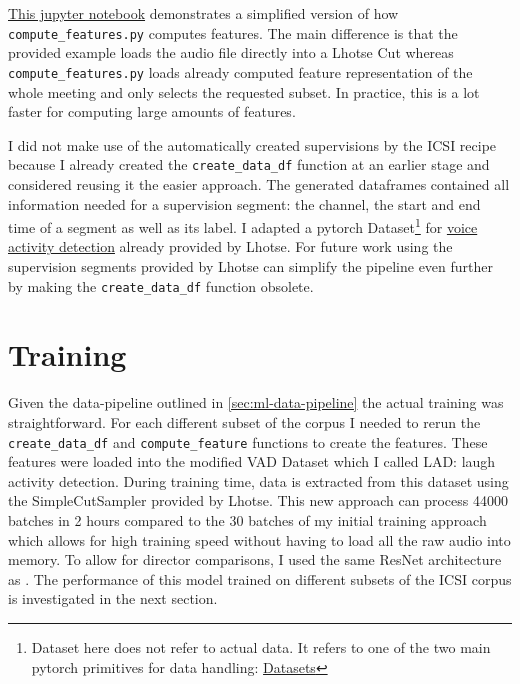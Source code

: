 \documentclass[bsc,frontabs,parskip,deptreport]{infthesis}
\begin{document}
\href{https://github.com/LasseWolter/laughter-detection-icsi/blob/main/Demo.ipynb}{This jupyter notebook} demonstrates a simplified version of how \verb|compute_features.py| computes features. 
The main difference is that the provided example loads the audio file directly into a Lhotse Cut whereas \verb|compute_features.py| loads already computed feature representation of the whole meeting and only selects the requested subset. In practice, this is a lot faster for computing large amounts of features.

I did not make use of the automatically created supervisions by the ICSI recipe because I already created the \verb|create_data_df| function at an earlier stage and considered reusing it the easier approach.
The generated dataframes contained all information needed for a supervision segment: the channel, the start and end time of a segment as well as its label. 
I adapted a pytorch Dataset\footnote{Dataset here does not refer to actual data. It refers to one of the two main pytorch primitives for data handling: \href{https://pytorch.org/tutorials/beginner/basics/data_tutorial.html}{Datasets}} for \href{https://lhotse.readthedocs.io/en/latest/datasets.html#lhotse.dataset.vad.VadDataset}{voice activity detection} already provided by Lhotse.
For future work using the supervision segments provided by Lhotse can simplify the pipeline even further by making the \verb|create_data_df| function obsolete. 

\section{Training}
Given the data-pipeline outlined in \autoref{sec:ml-data-pipeline} the actual training was straightforward. For each different subset of the corpus I needed to rerun the \verb|create_data_df| and \verb|compute_feature| functions to create the features. 
These features were loaded into the modified VAD Dataset which I called LAD: laugh activity detection.
During training time, data is extracted from this dataset using the SimpleCutSampler provided by Lhotse. 
This new approach can process 44000 batches in 2 hours compared to the 30 batches of my initial training approach which allows for high training speed without having to load all the raw audio into memory.
To allow for director comparisons, I used the same ResNet architecture as \citet{gillick2021robust}.
The performance of this model trained on different subsets of the ICSI corpus is investigated in the next section.
\end{document}
